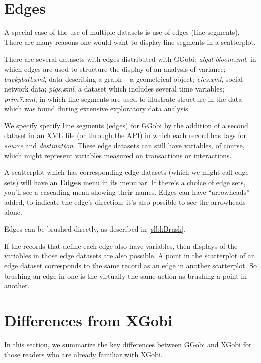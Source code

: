 \documentclass[11pt]{article}
\begin{document}
\section{Edges}

A special case of the use of multiple datasets is use of edges (line
segments).  There are many reasons one would want to display line segments
in a scatterplot. 

There are several datasets with edges distributed with GGobi: {\em
algal-bloom.xml}, in which edges are used to structure the display of an
analysis of variance; {\em buckyball.xml}, data describing a graph -- a
geometrical object; {\em eies.xml}, social network data; {\em pigs.xml},
a dataset which includes several time variables; {\em prim7.xml},
in which line segments are used to illustrate structure in the
data which was found during extensive exploratory data analysis.

We specify specify line segments (edges) for GGobi by the addition of a
second dataset in an XML file (or through the API) in which each record
has tags for {\it source} and {\it destination}.  These edge datasets
can still have variables, of course, which might represent variables
measured on transactions or interactions.

A scatterplot which has corresponding edge datasets (which we might call
edge sets) will have an {\bf Edges} menu in its menubar.  If there's a
choice of edge sets, you'll see a cascading menu showing their names.
Edges can have ``arrowheads'' added, to indicate the edge's direction;
it's also possible to see the arrowheads alone.

Edges can be brushed directly, as described in \ref{slbl:Brush}.

If the records that define each edge also have variables, then
displays of the variables in those edge datasets are also possible.
A point in the scatterplot of an edge dataset corresponds to the
same record as an edge in another scatterplot.  So brushing an
edge in one is the virtually the same action as brushing a point
in another.

\newpage
\section{Differences from XGobi}
\label{slbl:xgobi}

In this section, we summarize the key differences between GGobi
and XGobi for those readers who are already familiar with XGobi.
\end{document}
